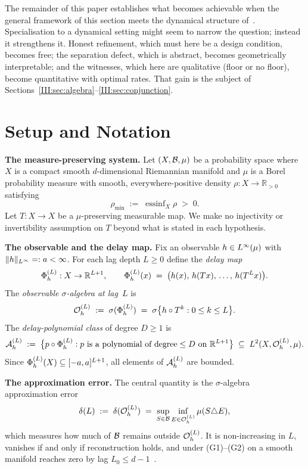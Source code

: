 The remainder of this paper establishes what becomes achievable when the
general framework of this section meets the dynamical structure of~\cite{mahon_paper2}.
Specialisation to a dynamical setting might seem to narrow the question;
instead it strengthens it.  Honest refinement, which must here be a design condition,
becomes free; the separation defect, which is abstract, becomes geometrically
interpretable; and the witnesses, which here are qualitative (floor or no
floor), become quantitative with optimal rates.  That gain is the subject of
Sections~\ref{III:sec:algebra}--\ref{III:sec:conjunction}.

\section{Setup and Notation}
\label{III:sec:setup}

\textbf{The measure-preserving system.}\enspace
Let $(X, \mathcal{B}, \mu)$ be a probability space where $X$ is a compact smooth
$d$-dimensional Riemannian manifold and $\mu$ is a Borel probability measure
with smooth, everywhere-positive density $\rho : X \to \mathbb{R}_{>0}$
satisfying
\[
  \rho_{\min} \;:=\; \operatorname{essinf}_X \rho \;>\; 0.
\]
Let $T : X \to X$ be a $\mu$-preserving measurable map.
We make no injectivity or invertibility assumption on $T$ beyond what
is stated in each hypothesis.

\textbf{The observable and the delay map.}\enspace
Fix an observable $h \in L^{\infty}(\mu)$ with $\|h\|_{L^{\infty}} =: a < \infty$.
For each lag depth $L \geq 0$ define the \emph{delay map}
\[
  \Phi_h^{(L)} : X \to \mathbb{R}^{L+1},
  \qquad
  \Phi_h^{(L)}(x) \;=\; \bigl(h(x),\, h(Tx),\, \ldots,\, h(T^L x)\bigr).
\]
The \emph{observable $\sigma$-algebra at lag~$L$} is
\[
  \mathcal{O}_h^{(L)} \;:=\; \sigma(\Phi_h^{(L)}) \;=\; \sigma\bigl\{h \circ T^k : 0 \leq k \leq L\bigr\}.
\]
The \emph{delay-polynomial class} of degree $D \geq 1$ is
\[
  \mathcal{A}_h^{(L)} \;:=\;
  \bigl\{p \circ \Phi_h^{(L)} : p \text{ is a polynomial of degree} \leq D \text{ on }
  \mathbb{R}^{L+1}\bigr\} \;\subseteq\; L^{2}(X, \mathcal{O}_h^{(L)}, \mu).
\]
Since $\Phi_h^{(L)}(X) \subseteq [-a,a]^{L+1}$, all elements of $\mathcal{A}_h^{(L)}$ are bounded.

\textbf{The approximation error.}\enspace
The central quantity is the $\sigma$-algebra approximation error
\begin{equation}
  \delta(L) \;:=\; \delta(\mathcal{O}_h^{(L)}) \;=\;
  \sup_{S \in \mathcal{B}} \inf_{E \in \mathcal{O}_h^{(L)}} \mu(S \triangle E),
  \label{III:eq:delta-def}
\end{equation}
which measures how much of $\mathcal{B}$ remains outside $\mathcal{O}_h^{(L)}$.
It is non-increasing in $L$, vanishes if and only if reconstruction holds,
and under (G1)--(G2) on a smooth manifold reaches zero by lag $L_0 \leq d-1$~\cite{mahon_paper2}.

